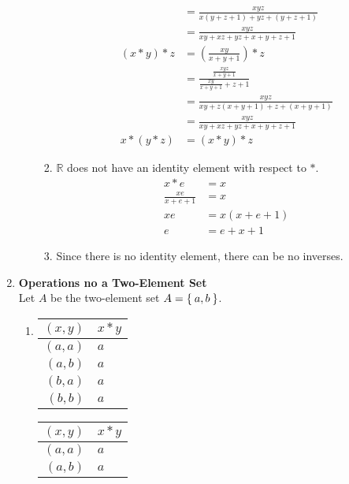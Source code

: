\begin{enumerate}[label={\Alph*.},font={\bfseries}]
\begin{enumerate}[label={\arabic*},font={\bfseries}]
\begin{enumerate}[label={(\roman*)}]
\begin{align*}
        &= \frac{xyz}{x(y+z+1)+yz+(y+z+1)} \\
        &= \frac{xyz}{xy+xz+yz+x+y+z+1} \\
        (x*y)*z &= \left(\frac{xy}{x+y+1}\right)*z \\
        &= \frac{\frac{xyz}{x+y+1}}{\frac{xy}{x+y+1}+z+1} \\
        &= \frac{xyz}{xy+z(x+y+1)+z+(x+y+1)} \\
        &= \frac{xyz}{xy+xz+yz+x+y+z+1} \\
        x*(y*z) &= (x*y)*z
      \end{align*}
    \item $\mathbb{R}$ does not have an identity element with respect to $*$.
      \begin{align*}
        x*e &= x \\
        \frac{xe}{x+e+1} &= x \\
        xe &= x(x+e+1) \\
        e &= e+x+1
      \end{align*}
    \item Since there is no identity element, there can be no inverses.
    \end{enumerate}
  \end{enumerate}
\item {\bf Operations no a Two-Element Set} \\
  Let $A$ be the two-element set $A=\Set{a,b}$.
  \begin{enumerate}[label={\arabic*},font={\bfseries}]
  \item
    \begin{minipage}[h]{.25\textwidth}
      \begin{tabular}{ r | l }
        $(x,y)$ & $x*y$ \\
        \hline
        $(a,a)$ & $a$ \\
        $(a,b)$ & $a$ \\
        $(b,a)$ & $a$ \\
        $(b,b)$ & $a$
      \end{tabular}
    \end{minipage}
    \begin{minipage}[h]{.25\textwidth}
      \begin{tabular}{ r | l }
        $(x,y)$ & $x*y$ \\
        \hline
        $(a,a)$ & $a$ \\
        $(a,b)$ & $a$ \\

\end{tabular}
\end{minipage}
\end{enumerate}
\end{enumerate}
